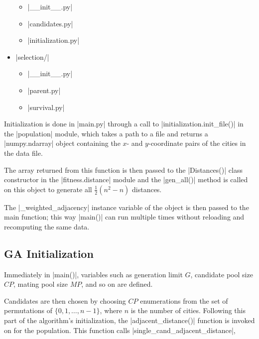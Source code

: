 \begin{multicols}{2}
\begin{itemize}[topsep=-12pt,leftmargin=22pt]
	\begin{itemize}[topsep=-1ex,leftmargin=12pt,itemsep=-.5ex]
		\item[\file] |__init__.py|
		\item[\file] |candidates.py|
		\item[\file] |initialization.py|
	\end{itemize}
	\item[\folder] |selection/|
	\begin{itemize}[topsep=-1ex,leftmargin=12pt,itemsep=-.5ex]
		\item[\file] |__init__.py|
		\item[\file] |parent.py|
		\item[\file] |survival.py|
	\end{itemize}
\end{itemize}
\end{multicols}
\egroup

Initialization is done in |main.py| through a call to |initialization.init_file()| in 
the |population| module, which takes a path to a file and returns a 
|numpy.ndarray| object containing the $x$- and $y$-coordinate pairs of the 
cities in the data file.

{\small}

The array returned from this function is then passed to the |Distances()| 
class constructor in the |fitness.distance| module and the |gen_all()| 
method is called on this object to generate all $\frac{1}{2}(n^2-n)$
distances.

{\small}

The |_weighted_adjacency| instance variable of the object is then passed 
to the main function; this way |main()| can run multiple times without reloading 
and recomputing the same data.

\subsection{GA Initialization}
Immediately in |main()|, variables such as generation limit $G$, candidate pool size $CP$, 
mating pool size $MP$, and so on are defined. 

Candidates are then chosen by choosing $CP$ enumerations from the set of 
permutations of $\{0, 1, \ldots, n-1\}$, where $n$ is the number of cities.
Following this part of the algorithm's initialization, the |adjacent_distance()| function
is invoked on for the population. This function calls |single_cand_adjacent_distance|,

